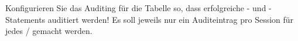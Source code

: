     \item Konfigurieren Sie das Auditing für die Tabelle  so, dass erfolgreiche - und -Statements auditiert werden! Es soll jeweils nur ein Auditeintrag pro Session für jedes  / gemacht werden.
